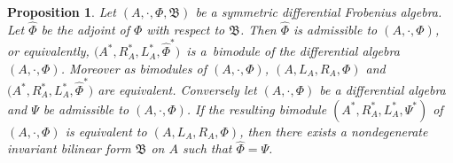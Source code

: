 \documentclass[10pt,a4paper]{amsart}
\numberwithin{equation}{section}
\newtheorem{Proposition}[Theorem]{Proposition}
{ \theoremstyle{definition}
	\newtheorem{Definition}[Theorem]{Definition}
	\newtheorem{Note}[Theorem]{Note}
	\newtheorem{Example}[Theorem]{Example}
	\newtheorem{Remark}[Theorem]{Remark} }
\begin{document}
\begin{Proposition}\label{pro:FroRep}
 Let $(A, \cdot, \Phi, \mathfrak{B})$ be a symmetric differential Frobenius algebra.
 Let $\hat{\Phi}$ be the adjoint of $\Phi$ with respect to $\mathfrak{B}$.
 Then $\hat{\Phi}$ is admissible to $(A, \cdot, \Phi)$, or equivalently,
 $\big(A^*, R_A^*, L_A^*, \hat{\Phi}^*\big)$~is a~bimodule of the differential algebra $(A, \cdot, \Phi)$.
 Moreover as bimodules of $(A, \cdot, \Phi)$, $(A, L_A, R_A, \Phi)$ and $\big(A^*, R_A^*, L_A^*, \hat{\Phi}^*\big)$ are equivalent.
 Conversely let $(A, \cdot, \Phi)$ be a differential algebra and $\Psi$ be admissible to $(A, \cdot, \Phi)$.
 If the resulting bimodule $(A^*, R_A^*, L_A^*, \Psi^*)$ of $(A, \cdot, \Phi)$ is equivalent to $(A, L_A, R_A, \Phi)$,
 then there exists a nondegenerate invariant bilinear form $\mathfrak{B}$ on $A$ such that $\hat{\Phi} = \Psi$.
\end{Proposition}
\end{document}
